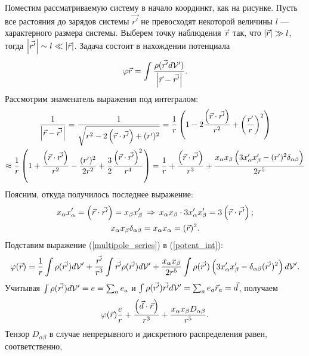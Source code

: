     Поместим рассматриваемую систему в начало координкт, как на рисунке. Пусть все растояния до зарядов системы $\vec{r'}$ не превосходят некоторой величины $l$ ---
    характерного размера системы. Выберем точку наблюдения $\vec{r}$ так, что $\left|{\vec{r}}\right| \gg l$, тогда $\left|{\vec{r'}}\right| \sim l \ll \left|{\vec{r}}\right|$. Задача состоит в
    нахождении потенциала
    \begin{equation}
        \varphi{\vec{r}} = \int \frac{\rho(\vec{r'} d\mathcal{V}')}{\left|{\vec{r} - \vec{r'}}\right|}. \label{potent_int}
    \end{equation}
    Рассмотрим знаменатель выражения под интегралом:
    \begin{gather}
        \frac{1}{\left|{\vec{r} - \vec{r'}}\right|} = \frac{1}{\sqrt{r^2 - 2\left({\vec{r}\cdot\vec{r'}}\right) + (r')^2}} = \frac{1}{r} \left({1 - 2\frac{\left({\vec{r}\cdot\vec{r'}}\right)}{r^2} + \left({\frac{r'}{r}}\right)^2}\right) \notag \\
        \approx \frac{1}{r}\left({1 + \frac{\left({\vec{r}\cdot\vec{r'}}\right)}{r^2} - \frac{(r')^2}{2r^2} + \frac{3}{2} \frac{\left({\vec{r}\cdot\vec{r'}}\right)^2}{r^4}}\right) = 
        \frac{1}{r} + \frac{\left({\vec{r}\cdot\vec{r'}}\right)}{r^3} + \frac{x_{\alpha} x_{\beta} \left({3x_{\alpha}'x_{\beta}' - (r')^2 \delta_{\alpha\beta}}\right)}{2r^5} \label{multipole_series}
    \end{gather}
    Поясним, откуда получилось последнее выражение:
    \begin{gather*}
        x_{\alpha}x_{\alpha}' = \left({\vec{r}\cdot\vec{r'}}\right) = x_{\beta}x_{\beta}' \: \Rightarrow \: x_{\alpha}x_{\beta} \cdot 3x_{\alpha}'x_{\beta}' = 3\left({\vec{r}\cdot\vec{r'}}\right);\\
        x_{\alpha} x_{\beta}\delta_{\alpha\beta} = x_{\alpha}x_{\alpha} = (\vec{r})^2.
    \end{gather*}
    Подставим выражение (\ref{multipole_series}) в (\ref{potent_int}):
    \begin{gather*}
        \varphi(\vec{r}) = \frac 1r \int \rho(\vec{r'}) d\mathcal{V}' + \frac{\vec{r'}}{r^3}\int \vec{r'}\rho(\vec{r'}) d\mathcal{V}' + \frac{x_{\alpha}x_{\beta}}{2r^5}\int\rho(\vec{r'})
        \left({3x_{\alpha}'x_{\beta}' - \delta_{\alpha\beta}(\vec{r'})^2}\right)d\mathcal{V}'.
    \end{gather*}
    Учитывая $\int \rho(\vec{r'}) d\mathcal{V}' = e = \sum_a e_a$ и $\int \rho(\vec{r'}) \vec{r'} d\mathcal{V}' = \sum_a e_a\vec{r}_a = \vec{d}$, получаем
    \begin{equation}
        \varphi(\vec{r}) \frac er + \frac{\left({\vec{d}\cdot\vec{r}}\right)}{r^3} + \frac{x_{\alpha}x_{\beta} D_{\alpha\beta}}{r^5}. \label{quad_potent}
    \end{equation}
    Тензор $D_{\alpha\beta}$ в случае непрерывного и дискретного распределения равен, соответственно,
